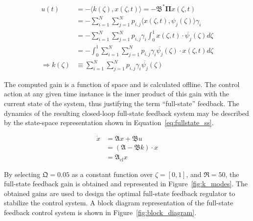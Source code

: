 \begin{equation} \label{eq:fullstate_gain}
    \begin{aligned}
        u(t) &= - \langle k (\zeta), x(\zeta, t) \rangle = - \mathfrak{B}^* \mathbf{\Pi} x(\zeta, t) \\
        &= - \sum_{i=1}^N\sum_{j=1}^N p_{i,j} \langle x(\zeta, t), \psi_j(\zeta) \rangle \gamma_i \\
        &= - \sum_{i=1}^N\sum_{j=1}^N p_{i,j} \gamma_i \int_0^1 x(\zeta, t) \cdot \overline{\psi_j}(\zeta) d\zeta \\
        &= - \int_0^1 \sum_{i=1}^N\sum_{j=1}^N p_{i,j} \gamma_i \overline{\psi_j}(\zeta) \cdot x(\zeta, t) d\zeta \\
        \Rightarrow k(\zeta) &\equiv \sum_{i=1}^N\sum_{j=1}^N p_{i,j} \gamma_i \overline{\psi_j}(\zeta)
    \end{aligned}
\end{equation}

The computed gain is a function of space and is calculated offline. The control action at any given time instance is the inner product of this gain with the current state of the system, thus justifying the term ``full-state'' feedback. The dynamics of the resulting closed-loop full-state feedback system may be described by the state-space representation shown in Equation~\ref{eq:fullstate_ss}.

\begin{equation}
    \begin{aligned} \label{eq:fullstate_ss}
        \dot{x} &= \mathfrak{A} x + \mathfrak{B} u \\
        &= (\mathfrak{A} - \mathfrak{B} k) \cdot x \\
        &= \mathfrak{A}_{\text{cl}} x
    \end{aligned}
\end{equation}

By selecting $\mathfrak{Q} = 0.05$ as a constant function over $\zeta = [0,1]$, and $\mathfrak{R} = 50$, the full-state feedback gain is obtained and represented in Figure~\ref{fig:k_modes}. The obtained gains are used to design the optimal full-state feedback regulator to stabilize the control system. A block diagram representation of the full-state feedback control system is shown in Figure~\ref{fig:block_diagram}.

